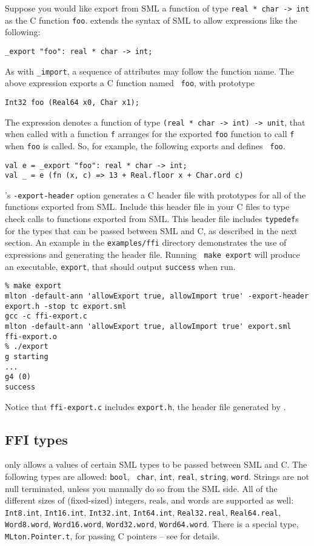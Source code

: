 Suppose you would like export from SML a function of type {\tt real *
char -> int} as the C function {\tt foo}.  {\mlton} extends the syntax
of SML to allow expressions like the following:
\begin{verbatim}
_export "foo": real * char -> int;
\end{verbatim}
As with {\tt \_import}, a sequence of attributes may follow the
function name.  The above expression exports a C function named {\tt
foo}, with prototype
\begin{verbatim}
Int32 foo (Real64 x0, Char x1);
\end{verbatim}
The {\export} expression denotes a function of type {\tt (real * char
-> int) -> unit}, that when called with a function {\tt f} arranges
for the exported {\tt foo} function to call {\tt f} when {\tt foo} is
called.  So, for example, the following exports and defines {\tt
foo}.
\begin{verbatim}
val e = _export "foo": real * char -> int;
val _ = e (fn (x, c) => 13 + Real.floor x + Char.ord c)
\end{verbatim}

{\mlton}'s {\tt -export-header} option generates a C header file with
prototypes for all of the functions exported from SML.  Include this
header file in your C files to type check calls to functions exported
from SML.  This header file includes {\tt typedef}s for the types that
can be passed between SML and C, as described in the next section.  An
example in the {\tt examples/ffi} directory demonstrates the use of
{\export} expressions and generating the header file.  Running {\tt
make export} will produce an executable, {\tt export}, that should
output {\tt success} when run.

\begin{verbatim}
% make export
mlton -default-ann 'allowExport true, allowImport true' -export-header export.h -stop tc export.sml
gcc -c ffi-export.c
mlton -default-ann 'allowExport true, allowImport true' export.sml ffi-export.o
% ./export
g starting
...
g4 (0)
success
\end{verbatim}
%
Notice that {\tt ffi-export.c} includes {\tt export.h}, the header
file generated by {\mlton}.
%
\subsection{FFI types}

{\mlton} only allows a values of certain SML types to be passed
between SML and C.  The following types are allowed: {\tt bool}, {\tt
char}, {\tt int}, {\tt real}, {\tt string}, {\tt word}.  Strings are
not null terminated, unless you manually do so from the SML side.  All
of the different sizes of (fixed-sized) integers, reals, and words are
supported as well: {\tt Int8.int}, {\tt Int16.int}, {\tt Int32.int},
{\tt Int64.int}, {\tt Real32.real}, {\tt Real64.real}, {\tt
Word8.word}, {\tt Word16.word}, {\tt Word32.word}, {\tt Word64.word}.
There is a special type, {\tt MLton.Pointer.t}, for passing C pointers
-- see  for details.

